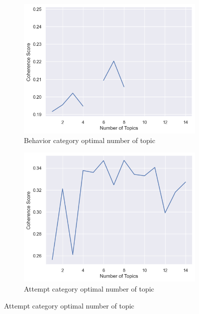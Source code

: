 \documentclass[sn-mathphys,Numbered]{sn-jnl}%
\theoremstyle{thmstyleone}%
\theoremstyle{thmstyletwo}%
\theoremstyle{thmstylethree}%
\begin{document}
\begin{figure}[h!]
\begin{subfigure}{0.45\textwidth}
    \includegraphics[width=\textwidth]{cv_behavior.png}
    \caption{Behavior category optimal number of topic}
    \label{redditdist}
\end{subfigure}
\hfill
\begin{subfigure}{0.45\textwidth}
    \includegraphics[width=\textwidth]{cv_attempt.png}
    \caption{Attempt category optimal number of topic}
    \label{twitterdist}
\end{subfigure}   
\label{redditdist_twitterdist}
\end{figure}
\end{document}
